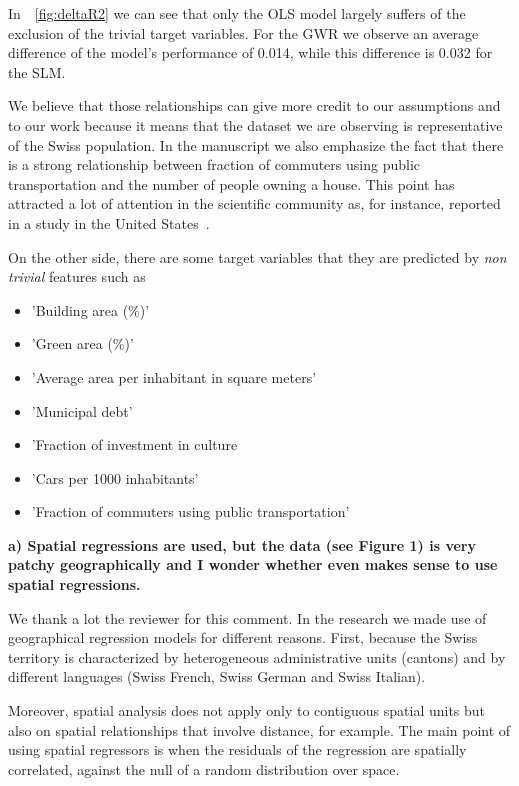 \documentclass[12pt]{article}
\begin{document}
In~\figurename~\ref{fig:deltaR2} we can see that only the OLS model largely suffers of the exclusion of the trivial target variables. For the GWR we observe an average difference of the model's performance of 0.014, while this difference is 0.032 for the SLM.

We believe that those relationships can give more credit to our assumptions and to our work because it means that the dataset we are observing is representative of the Swiss population.  In the manuscript we also emphasize the fact that there is a strong relationship between fraction of commuters using public transportation and the number of people owning a house.  This point has attracted a lot of attention in the scientific community as, for instance, reported in a study in the United States~\cite{zhang2018exploring}.

On the other side, there are some target variables that they are predicted by \emph{non trivial} features such as
\begin{itemize}
\item 'Building area (\%)'
\item 'Green area (\%)'
\item 'Average area per inhabitant in square meters'
\item 'Municipal debt' 
\item 'Fraction of investment in culture
\item 'Cars per 1000 inhabitants'
\item 'Fraction of commuters using public transportation'
\end{itemize}



\vspace{1cm}
\textbf{a) Spatial regressions are used, but the data (see Figure 1) is very patchy geographically and I wonder whether even makes sense to use spatial regressions.}

We thank a lot the reviewer for this comment.  In the research we made use of geographical regression models for different reasons. First, because the Swiss territory is characterized by heterogeneous administrative units (cantons) and by different languages (Swiss French, Swiss German and Swiss Italian). 

Moreover, spatial analysis does not apply only to contiguous spatial units but also on spatial relationships that involve distance, for example. The main point of using spatial regressors is when the residuals of the regression are spatially correlated, against the null of a random distribution over space.
\end{document}
